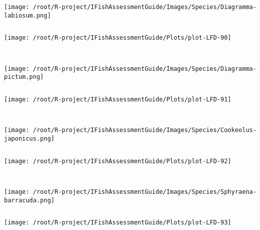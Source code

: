 \begin{knitrout}
\begin{kframe}
\begin{verbatim}
\end{verbatim}
\end{kframe}
\texttt{[image: /root/R-project/IFishAssessmentGuide/Images/Species/Diagramma-labiosum.png]}
\begin{kframe}\begin{verbatim}
\end{verbatim}
\end{kframe}
\texttt{[image: /root/R-project/IFishAssessmentGuide/Plots/plot-LFD-90]} 
\begin{kframe}\begin{verbatim}
 
\end{verbatim}
\end{kframe}
\texttt{[image: /root/R-project/IFishAssessmentGuide/Images/Species/Diagramma-pictum.png]}
\begin{kframe}\begin{verbatim}
\end{verbatim}
\end{kframe}
\texttt{[image: /root/R-project/IFishAssessmentGuide/Plots/plot-LFD-91]} 
\begin{kframe}\begin{verbatim}
 
\end{verbatim}
\end{kframe}
\texttt{[image: /root/R-project/IFishAssessmentGuide/Images/Species/Cookeolus-japonicus.png]}
\begin{kframe}\begin{verbatim}
\end{verbatim}
\end{kframe}
\texttt{[image: /root/R-project/IFishAssessmentGuide/Plots/plot-LFD-92]} 
\begin{kframe}\begin{verbatim}
 
\end{verbatim}
\end{kframe}
\texttt{[image: /root/R-project/IFishAssessmentGuide/Images/Species/Sphyraena-barracuda.png]}
\begin{kframe}\begin{verbatim}
\end{verbatim}
\end{kframe}
\texttt{[image: /root/R-project/IFishAssessmentGuide/Plots/plot-LFD-93]} 
\begin{kframe}\begin{verbatim}
 

\end{verbatim}
\end{kframe}
\end{knitrout}
